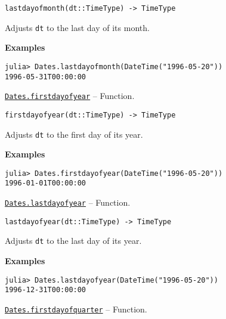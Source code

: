 \begin{adjustwidth}{2em}{0pt}


\begin{verbatim}
lastdayofmonth(dt::TimeType) -> TimeType
\end{verbatim}

Adjusts \texttt{dt} to the last day of its month.

\textbf{Examples}


\begin{verbatim}
julia> Dates.lastdayofmonth(DateTime("1996-05-20"))
1996-05-31T00:00:00
\end{verbatim}



\end{adjustwidth}
\hypertarget{16489505143268736660}{}
\hyperlink{16489505143268736660}{\texttt{Dates.firstdayofyear}}  -- {Function.}

\begin{adjustwidth}{2em}{0pt}


\begin{verbatim}
firstdayofyear(dt::TimeType) -> TimeType
\end{verbatim}

Adjusts \texttt{dt} to the first day of its year.

\textbf{Examples}


\begin{verbatim}
julia> Dates.firstdayofyear(DateTime("1996-05-20"))
1996-01-01T00:00:00
\end{verbatim}



\end{adjustwidth}
\hypertarget{10580858002556506121}{}
\hyperlink{10580858002556506121}{\texttt{Dates.lastdayofyear}}  -- {Function.}

\begin{adjustwidth}{2em}{0pt}


\begin{verbatim}
lastdayofyear(dt::TimeType) -> TimeType
\end{verbatim}

Adjusts \texttt{dt} to the last day of its year.

\textbf{Examples}


\begin{verbatim}
julia> Dates.lastdayofyear(DateTime("1996-05-20"))
1996-12-31T00:00:00
\end{verbatim}



\end{adjustwidth}
\hypertarget{16102783699720368943}{}
\hyperlink{16102783699720368943}{\texttt{Dates.firstdayofquarter}}  -- {Function.}

